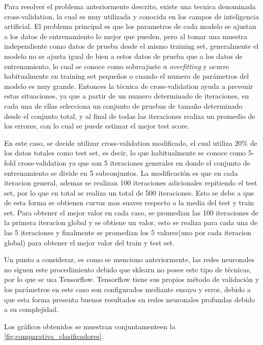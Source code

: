Para resolver el problema anteriormente descrito, existe una tecnica denominada cross-validation, la cual es muy utilizada y conocida en los campos de inteligencia artificial. El problema principal es que los parametros de cada modelo se ajustan a los datos de entrenamiento lo mejor que pueden, pero al tomar una muestra independiente como datos de prueba desde el mismo training set, generalmente el modelo no se ajusta igual de bien a estos datos de prueba que a los datos de entrenamiento, lo cual se conoce como sobreajuste u \textit{overfitting} y ocurre habitualmente en training set pequeños o cuando el numero de parámetros del modelo es muy grande. Entonces la técnica de cross-validation ayuda a prevenir estas situaciones, ya que a partir de un numero determinado de iteraciones, en cada una de ellas selecciona un conjunto de pruebas de tamaño determinado desde el conjunto total, y al final de todas las iteraciones realiza un promedio de los errores, con lo cual se puede estimar el mejor test score.

En este caso, se decide utilizar cross-validation modificado, el cual utiliza $20\%$ de los datos totales como test set, es decir, lo que habitualmente se conoce como 5-fold cross-validation ya que son 5 iteraciones generales en donde el conjunto de entrenamiento se divide en 5 subconjuntos. La modificación es que en cada iteracion general, ademas se realizan 100 iteraciones adicionales repitiendo el test set, por lo que en total se realiza un total de 500 iteraciones. Esto se debe a que de esta forma se obtienen curvas mas suaves respecto a la media del test y train set. Para obtener el mejor valor en cada caso, se promedian las 100 iteraciones de la primera iteracion global y se obtiene un valor, esto se realiza para cada una de las 5 iteraciones y finalmente se promedian los 5 valores(uno por cada iteracion global) para obtener el mejor valor del train y test set.

Un punto a considerar, es como se menciono anteriormente, las redes neuronales no siguen este procedimiento debido que sklearn no posee este tipo de técnicas, por lo que se usa Tensorflow. Tensorflow tiene sus propios método de validación y los parámetros en este caso son configurados mediante ensayo y error, debido a que esta forma presenta buenos resultados en redes neuronales profundas debido a su complejidad.

Los gráficos obtenidos se muestran conjuntamenteen la \autoref{fig:comparativa_clasificadores}.

